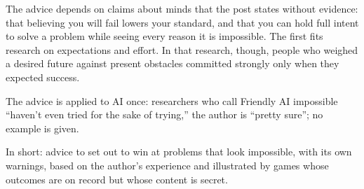 \begin{afterword}
The advice depends on claims about minds that the post states without evidence: that believing you will fail lowers your standard, and that you can hold full intent to solve a problem while seeing every reason it is impossible. The first fits research on expectations and effort. In that research, though, people who weighed a desired future against present obstacles committed strongly only when they expected success.

The advice is applied to AI once: researchers who call Friendly AI impossible ``haven't even tried for the sake of trying,'' the author is ``pretty sure''; no example is given.

In short: advice to set out to win at problems that look impossible, with its own warnings, based on the author's experience and illustrated by games whose outcomes are on record but whose content is secret.
\end{afterword}
